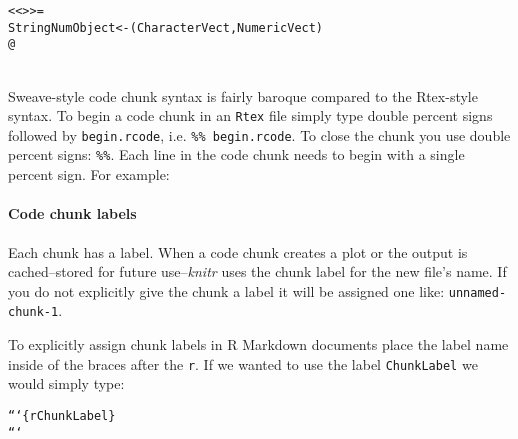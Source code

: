 \begin{knitrout}
\color{fgcolor}\begin{kframe}
\begin{alltt}
\textless\textless \textgreater\textgreater=
StringNumObject <- (CharacterVect, NumericVect)
@
\end{alltt}
\end{kframe}
\end{knitrout}

 \\[0.25cm]

Sweave-style code chunk syntax is fairly baroque compared to the Rtex-style syntax. To begin a code chunk in an \texttt{Rtex} file simply type double percent signs followed by \texttt{begin.rcode}, i.e. \texttt{\%\% begin.rcode}. To close the chunk you use double percent signs: \texttt{\%\%}. Each line in the code chunk needs to begin with a single percent sign. For example:

\begin{knitrout}
\color{fgcolor}\begin{kframe}
\begin{alltt}
%% begin.rcode
% \hlcomment{# Example of a Rtex-style code chunk}
% StringNumObject <- \hlfunctioncall{cbind}(CharacterVect, NumericVect)
%%
\end{alltt}
\end{kframe}
\end{knitrout}


\paragraph{Code chunk labels}

Each chunk has a label. When a code chunk creates a plot or the output is cached--stored for future use--{\emph{knitr}} uses the chunk label for the new file's name. If you do not explicitly give the chunk a label it will be assigned one like: \texttt{unnamed-chunk-1}.

To explicitly assign chunk labels in R Markdown documents place the label name inside of the braces after the \texttt{r}. If we wanted to use the label \texttt{ChunkLabel} we would simply type:

\begin{knitrout}
\color{fgcolor}\begin{kframe}
\begin{alltt}
```\{r ChunkLabel\}
```
\end{alltt}
\end{kframe}
\end{knitrout}


